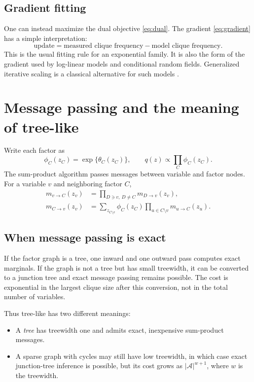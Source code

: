 \documentclass[11pt]{article}
\newcommand{\1}{\mathbf 1}
\newcommand{\mcA}{\mathcal A}
\begin{document}
\subsection{Gradient fitting}

One can instead maximize the dual objective \eqref{eq:dual}.  The gradient
\eqref{eq:gradient} has a simple interpretation:
\[
  \text{update}
  =
  \text{measured clique frequency}
  -
  \text{model clique frequency}.
\]
This is the usual fitting rule for an exponential family.  It is also the form
of the gradient used by log-linear models and conditional random fields.
Generalized iterative scaling is a classical alternative for such models
\cite{darroch_ratcliff}.

\section{Message passing and the meaning of tree-like}

Write each factor as
\[
  \phi_C(z_C)=\exp\{\theta_C(z_C)\},
  \qquad
  q(z)\propto\prod_C\phi_C(z_C).
\]
The sum-product algorithm passes messages between variable and factor nodes.
For a variable \(v\) and neighboring factor \(C\),
\begin{align}
  m_{v\to C}(z_v)
  &=
  \prod_{D\ni v,\ D\neq C}m_{D\to v}(z_v), \label{eq:var_message}\\
  m_{C\to v}(z_v)
  &=
  \sum_{z_{C\setminus v}}
  \phi_C(z_C)
  \prod_{u\in C\setminus v}m_{u\to C}(z_u).
  \label{eq:factor_message}
\end{align}

\subsection{When message passing is exact}

If the factor graph is a tree, one inward and one outward pass computes exact
marginals.  If the graph is not a tree but has small treewidth, it can be
converted to a junction tree and exact message passing remains possible.  The
cost is exponential in the largest clique size after this conversion, not in
the total number of variables.

Thus tree-like has two different meanings:
\begin{itemize}
  \item A \emph{tree} has treewidth one and admits exact, inexpensive
  sum-product messages.
  \item A sparse graph with cycles may still have low treewidth, in which case
  exact junction-tree inference is possible, but its cost grows as
  \(\lvert\mcA\rvert^{w+1}\), where \(w\) is the treewidth.
\end{itemize}
\end{document}
